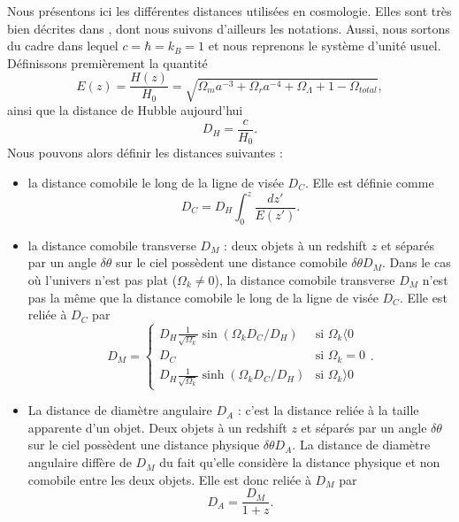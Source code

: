 \documentclass[11pt, twoside, a4paper, openright]{report}
\begin{document}
Nous présentons ici les différentes distances utilisées en cosmologie. Elles sont très bien décrites dans \cite{CITE: Hogg 1999}, dont nous suivons d'ailleurs les notations. Aussi, nous sortons du cadre dans lequel $c = \hbar = k_{B} = 1$ et nous reprenons le système d'unité usuel. Définissons premièrement la quantité
\begin{equation}
  \label{eq:dist_ez}
  E(z) = \frac{H(z)}{H_0} 
  = \sqrt{\Omega_m a^{-3} + \Omega_r a^{-4} + \Omega_{\Lambda} + 1 - \Omega_{total}} ,
\end{equation}
ainsi que la distance de Hubble aujourd'hui
\begin{equation}
  \label{eq:dist_hubble}
  D_H = \frac{c}{H_0} .
\end{equation}
Nous pouvons alors définir les distances suivantes :
\begin{itemize}[label=$\bullet$]
\item la distance comobile le long de la ligne de visée $D_{C}$. Elle est définie comme
  \begin{equation}
    \label{eq:dist_como}
    D_{C} = D_H \int_0^z \frac{dz'}{E(z')} .
  \end{equation}
\item la distance comobile transverse $D_M$ : deux objets à un redshift $z$ et séparés par un angle $\delta \theta$ sur le ciel possèdent une distance comobile $\delta \theta D_M$.
  Dans le cas où l'univers n'est pas plat ($\Omega_k \neq 0$), la distance comobile transverse $D_M$  n'est pas la même que la distance comobile le long de la ligne de visée $D_{C}$. Elle est reliée à $D_{C}$ par
  \begin{equation}
    \label{eq:dist_como_trans}
    D_M = \left\{
      \begin{array}{ll}
        D_H \frac{1}{\sqrt{\Omega_k}} \sin(\Omega_k D_C / D_H) & \mbox{si } \Omega_k \langle 0 \\
        D_C & \textrm{si } \Omega_k = 0 \\
        D_H \frac{1}{\sqrt{\Omega_k}} \sinh(\Omega_k D_C / D_H) & \mbox{si } \Omega_k \rangle 0
      \end{array}
    \right..
  \end{equation}
 
\item La distance de diamètre angulaire $D_A$ : c'est la distance reliée à la taille apparente d'un objet. Deux objets à un redshift $z$ et séparés par un angle $\delta \theta$ sur le ciel possèdent une distance physique $\delta \theta D_A$. La distance de diamètre angulaire diffère de $D_M$ du fait qu'elle considère la distance physique et non comobile entre les deux objets. Elle est donc reliée à $D_M$ par
  \begin{equation}
    \label{eq:dist_ang}
    D_A = \frac{D_M}{1+z}.
  \end{equation}


\end{itemize}
\end{document}
